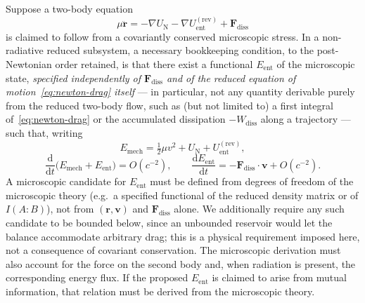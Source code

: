 \begin{proposition}
  \label{prop:allowed-drag}
  Suppose a two-body equation
  \begin{equation}
    \label{eq:newton-drag}
    \mu\ddot{\mathbf{r}}
    =-\nabla U_{\mathrm{N}}
     -\nabla U_{\mathrm{ent}}^{\mathrm{(rev)}}
     +\mathbf{F}_{\mathrm{diss}}
  \end{equation}
  is claimed to follow from a covariantly conserved microscopic
  stress. In a non-radiative reduced subsystem, a necessary
  bookkeeping condition, to the post-Newtonian order retained, is
  that there exist a functional \(E_{\mathrm{ent}}\) of the
  microscopic state, \emph{specified independently of
  \(\mathbf{F}_{\mathrm{diss}}\) and of the reduced equation of
  motion~\eqref{eq:newton-drag} itself} --- in particular, not any
  quantity derivable purely from the reduced two-body flow, such as
  (but not limited to) a first integral of~\eqref{eq:newton-drag} or
  the accumulated dissipation \(-W_{\mathrm{diss}}\) along a
  trajectory --- such that, writing
  \[
    E_{\mathrm{mech}}
    =\tfrac12\mu v^2+U_{\mathrm{N}}+U_{\mathrm{ent}}^{\mathrm{(rev)}},
  \]
  \begin{equation}
    \label{eq:energy-balance}
    \frac{\mathrm{d}}{\mathrm{d}t}
    \bigl(E_{\mathrm{mech}}+E_{\mathrm{ent}}\bigr)
    =O(c^{-2}),
    \qquad
    \frac{\mathrm{d}E_{\mathrm{ent}}}{\mathrm{d}t}
    =-\mathbf{F}_{\mathrm{diss}}\cdot\mathbf{v}
     +O(c^{-2}).
  \end{equation}
  A microscopic candidate for \(E_{\mathrm{ent}}\) must be defined
  from degrees of freedom of the microscopic theory (e.g.\ a
  specified functional of the reduced density matrix or of
  \(I(A:B)\)), not from \((\mathbf r,\mathbf v)\) and
  \(\mathbf F_{\mathrm{diss}}\) alone. We additionally require any
  such candidate to be bounded below, since an unbounded reservoir
  would let the balance accommodate arbitrary drag; this is a
  physical requirement imposed here, not a consequence of covariant
  conservation. The microscopic derivation must also account for the
  force on the second body and, when radiation is present, the
  corresponding energy flux. If the proposed \(E_{\mathrm{ent}}\) is
  claimed to arise from mutual information, that relation must be
  derived from the microscopic theory.
\end{proposition}

